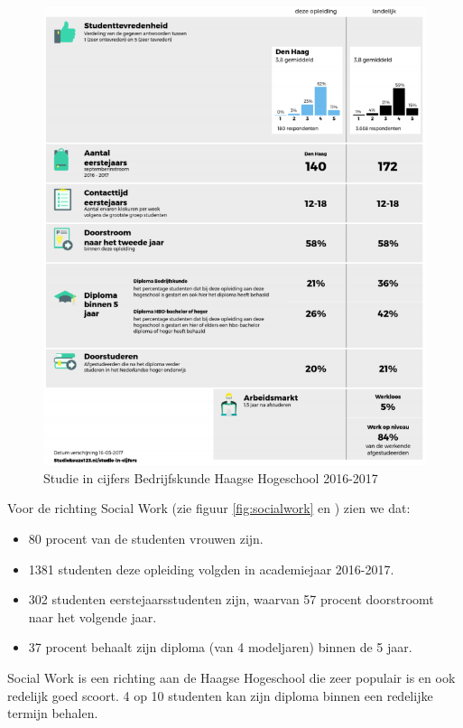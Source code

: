 \begin{figure}
	\includegraphics[width=\textwidth]
	{img/bedrijfskunde.png}
	\caption{Studie in cijfers Bedrijfskunde Haagse Hogeschool 2016-2017}
	\label{fig:bedrijfskunde}
\end{figure}

Voor de richting Social Work (zie figuur \ref{fig:socialwork} en \textcite{Studiekeuze2017}) zien we dat:
\begin{itemize}
	\item 80 procent van de studenten vrouwen zijn.
	\item 1381 studenten deze opleiding volgden in academiejaar 2016-2017.
	\item 302 studenten eerstejaarsstudenten zijn, waarvan 57 procent doorstroomt naar het volgende jaar.
	\item 37 procent behaalt zijn diploma (van 4 modeljaren) binnen de 5 jaar.
\end{itemize}

Social Work is een richting aan de Haagse Hogeschool die zeer populair is en ook redelijk goed scoort. 4 op 10 studenten kan zijn diploma binnen een redelijke termijn behalen. 

